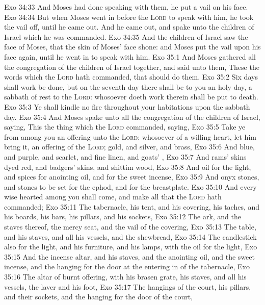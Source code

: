 \vs Exo 34:33 And  Moses had done speaking with them, he put a vail on his face.
\vs Exo 34:34 But when Moses went in before the \textsc{Lord} to speak with him, he took the vail off, until he came out. And he came out, and spake unto the children of Israel  which he was commanded.
\vs Exo 34:35 And the children of Israel saw the face of Moses, that the skin of Moses' face shone: and Moses put the vail upon his face again, until he went in to speak with him.
\vs Exo 35:1 And Moses gathered all the congregation of the children of Israel together, and said unto them, These  the words which the \textsc{Lord} hath commanded, that  should do them.
\vs Exo 35:2 Six days shall work be done, but on the seventh day there shall be to you an holy day, a sabbath of rest to the \textsc{Lord}: whosoever doeth work therein shall be put to death.
\vs Exo 35:3 Ye shall kindle no fire throughout your habitations upon the sabbath day.
\vs Exo 35:4 And Moses spake unto all the congregation of the children of Israel, saying, This  the thing which the \textsc{Lord} commanded, saying,
\vs Exo 35:5 Take ye from among you an offering unto the \textsc{Lord}: whosoever  of a willing heart, let him bring it, an offering of the \textsc{Lord}; gold, and silver, and brass,
\vs Exo 35:6 And blue, and purple, and scarlet, and fine linen, and goats' ,
\vs Exo 35:7 And rams' skins dyed red, and badgers' skins, and shittim wood,
\vs Exo 35:8 And oil for the light, and spices for anointing oil, and for the sweet incense,
\vs Exo 35:9 And onyx stones, and stones to be set for the ephod, and for the breastplate.
\vs Exo 35:10 And every wise hearted among you shall come, and make all that the \textsc{Lord} hath commanded;
\vs Exo 35:11 The tabernacle, his tent, and his covering, his taches, and his boards, his bars, his pillars, and his sockets,
\vs Exo 35:12 The ark, and the staves thereof,  the mercy seat, and the vail of the covering,
\vs Exo 35:13 The table, and his staves, and all his vessels, and the shewbread,
\vs Exo 35:14 The candlestick also for the light, and his furniture, and his lamps, with the oil for the light,
\vs Exo 35:15 And the incense altar, and his staves, and the anointing oil, and the sweet incense, and the hanging for the door at the entering in of the tabernacle,
\vs Exo 35:16 The altar of burnt offering, with his brasen grate, his staves, and all his vessels, the laver and his foot,
\vs Exo 35:17 The hangings of the court, his pillars, and their sockets, and the hanging for the door of the court,
